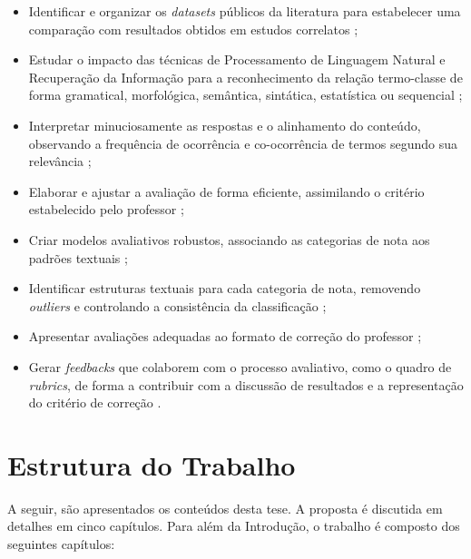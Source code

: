 \begin{itemize}
\item Identificar e organizar os \textit{datasets} públicos da literatura para estabelecer uma comparação com resultados obtidos em estudos correlatos \cite{burrows2015};
\item Estudar o impacto das técnicas de Processamento de Linguagem Natural e Recuperação da Informação para a reconhecimento da relação termo-classe de forma gramatical, morfológica, semântica, sintática, estatística ou sequencial \cite{galhardi2018a, kumar2019, sahu2020};
\item Interpretar minuciosamente as respostas e o alinhamento do conteúdo, observando a frequência de ocorrência e co-ocorrência de termos segundo sua relevância \cite{jordan2012, saha2018, ding2020};
\item Elaborar e ajustar a avaliação de forma eficiente, assimilando o critério estabelecido pelo professor \cite{zesch2015, condor2020, lui2022};
\item Criar modelos avaliativos robustos, associando as categorias de nota aos padrões textuais \cite{butcher2010, heilman2015, burrows2015};
\item Identificar estruturas textuais para cada categoria de nota, removendo \textit{outliers} e controlando a consistência da classificação \cite{ding2020, filighera2020};
\item Apresentar avaliações adequadas ao formato de correção do professor \cite{higgins2014, funayama2020, pado2021};
\item Gerar \textit{feedbacks} que colaborem com o processo avaliativo, como o quadro de \textit{rubrics}, de forma a contribuir com a discussão de resultados e a representação do critério de correção \cite{mizumoto2019, suzen2020, bernius2022}.
\end{itemize}


\section{Estrutura do Trabalho}

A seguir, são apresentados os conteúdos desta tese. A proposta é discutida em detalhes em cinco capítulos. Para além da Introdução, o trabalho é composto dos seguintes capítulos:


